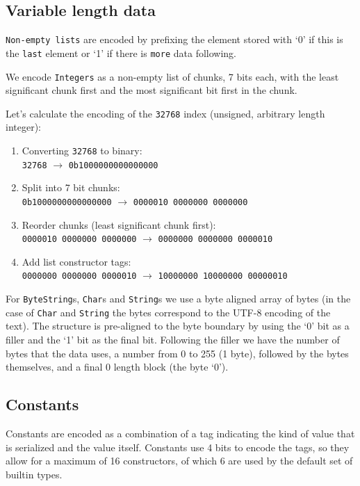 \documentclass[a4paper]{article}
\begin{document}
\begin{appendices}
\subsection{Variable length data}

\texttt{Non-empty lists} are encoded by prefixing the element stored with `0'
if this is the \texttt{last} element or `1' if there is \texttt{more} data following.

\noindent We encode \texttt{Integers} as a non-empty list of chunks, 7 bits each,
with the least significant chunk first and the most significant bit first in the chunk.

\medskip
\noindent Let's calculate the encoding of the \texttt{32768} index (unsigned, arbitrary
length integer):
\begin{enumerate}
  \item Converting \texttt{32768} to binary: \\
    \verb|32768| $\rightarrow$ \verb|0b1000000000000000|
  \item Split into 7 bit chunks: \\
    \verb|0b1000000000000000| $\rightarrow$ \verb|0000010 0000000 0000000|
  \item Reorder chunks (least significant chunk first): \\
    \verb|0000010 0000000 0000000| $\rightarrow$ \verb|0000000 0000000 0000010|
  \item Add list constructor tags: \\
    \verb|0000000 0000000 0000010| $\rightarrow$ \verb|10000000 10000000 00000010|
\end{enumerate}

For \texttt{ByteString}s, \texttt{Char}s and \texttt{String}s we use a byte aligned
array of bytes (in the case of \texttt{Char} and \texttt{String} the bytes correspond
to the UTF-8 encoding of the text). The structure is pre-aligned to the byte boundary
by using the `0' bit as a filler and the `1' bit as the final bit. Following the filler
we have the number of bytes that the data uses, a number from 0 to 255 (1 byte),
followed by the bytes themselves, and a final 0 length block (the byte `0').

\subsection{Constants}

Constants are encoded as a combination of a tag indicating the kind of value that is serialized and the
value itself. Constants use 4 bits to encode the tags, so they allow for a
maximum of 16 constructors, of which 6 are used by the default set of builtin types.


\end{appendices}
\end{document}
